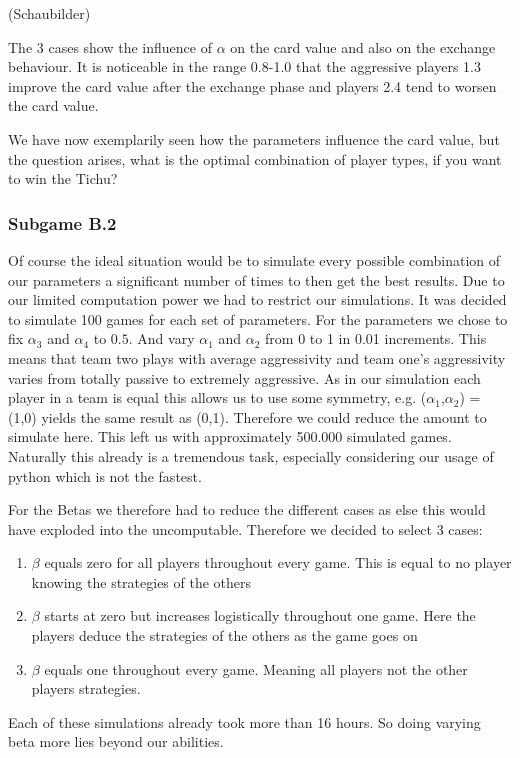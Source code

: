 (Schaubilder)

The 3 cases show the influence of $\alpha$ on the card value and also on the exchange behaviour. It is noticeable in the range 0.8-1.0 that the aggressive players 1.3 improve the card value after the exchange phase and players 2.4 tend to worsen the card value.

We have now exemplarily seen how the parameters influence the card value, but the question arises, what is the optimal combination of player types, if you want to win the Tichu?

\subsubsection{Subgame B.2}
Of course the ideal situation would be to simulate every possible combination of our parameters a significant number of times to then get the best results. Due to our limited computation power we had to restrict our simulations. It was decided to simulate 100 games for each set of parameters. For the parameters we chose to fix $\alpha_3$ and $\alpha_4$ to $0.5$. And vary $\alpha_1$ and $\alpha_2$ from 0 to 1 in 0.01 increments. This means that team two plays with average aggressivity and team one’s aggressivity varies from totally passive to extremely aggressive. As in our simulation each player in a team is equal this allows us to use some symmetry, e.g. ($\alpha_1$,$\alpha_2$) = (1,0) yields the same result as (0,1). Therefore we could reduce the amount to simulate here. This left us with approximately 500.000 simulated games. Naturally this already is a tremendous task, especially considering our usage of python which is not the fastest.

For the Betas we therefore had to reduce the different cases as else this would have exploded into the uncomputable. Therefore we decided to select 3 cases:
\begin{enumerate}
\item $\beta$ equals zero for all players throughout every game. This is equal to no player knowing the strategies of the others
\item $\beta$ starts at zero but increases logistically throughout one game. Here the players deduce the strategies of the others as the game goes on
\item $\beta$ equals one throughout every game. Meaning all players not the other players strategies.
\end{enumerate}
Each of these simulations already took more than 16 hours. So doing varying beta more lies beyond our abilities. 

